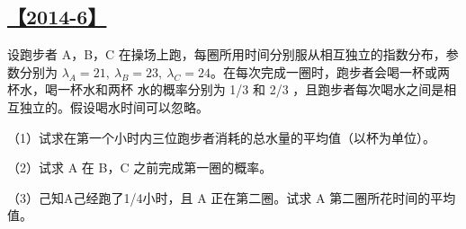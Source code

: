 \subsection{\hyperref[A2014-6]{【2014-6】}}\label{Q2014-6}

设跑步者 A，B，C 在操场上跑，每圈所用时间分别服从相互独立的指数分布，参数分别为
$\lambda_A=21,\ \lambda_B=23,\ \lambda_C=24$。在每次完成一圈时，跑步者会喝一杯或两杯水，喝一杯水和两杯
水的概率分别为 1/3 和 2/3 ，且跑步者每次喝水之间是相互独立的。假设喝水时间可以忽略。

（1）试求在第一个小时内三位跑步者消耗的总水量的平均值（以杯为单位）。

（2）试求 A 在 B，C 之前完成第一圈的概率。

（3）己知A己经跑了1/4小时，且 A 正在第二圈。试求 A 第二圈所花时间的平均值。